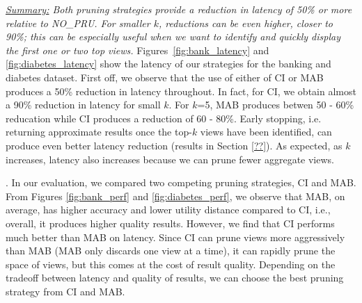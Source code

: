 {\em \underline{Summary:} Both pruning strategies provide a reduction in latency of 50\% or more
relative to NO\_PRU. For smaller $k$, reductions can be even higher, closer to 90\%; this can be
especially useful when we want to identify and quickly display the first one or two top views.}
Figures~\ref{fig:bank_latency} and \ref{fig:diabetes_latency} show the latency
of our strategies for the banking and diabetes dataset.
First off, we observe that the use of either of CI or MAB produces a 50\% reduction in latency
throughout.
In fact, for CI, we obtain almost a 90\% reduction in latency for small $k$. 
For $k$=5, MAB produces betwen 50 - 60\% reducation while CI produces a reduction of 60 - 80\%.
Early stopping, i.e. returning approximate results once the top-$k$ views have been identified, 
can produce even better latency reduction (results in Section \ref{??}).
As expected, as $k$ increases, latency also increases because we can prune fewer aggregate views.

.
In our evaluation, we compared two competing pruning strategies, CI and MAB. 
From Figures \ref{fig:bank_perf} and \ref{fig:diabetes_perf}, we observe that MAB, 
on average, has higher accuracy and lower utility distance compared to
CI, i.e., overall, it produces higher quality results.
However, we find that CI performs much better than MAB on latency.
Since CI can prune views more aggressively than MAB (MAB only discards one view at a time),
it can rapidly prune the space of views, but this comes at the cost of result quality.
Depending on the tradeoff between latency and quality of results, we can choose the best
pruning strategy from CI and MAB.

